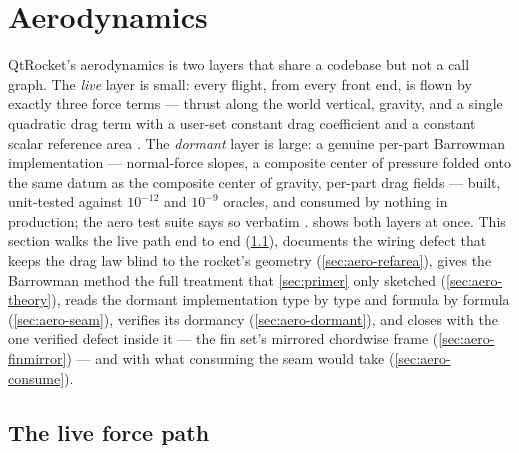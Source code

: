 \section{Aerodynamics}\label{sec:aero}

QtRocket's aerodynamics is two layers that share a codebase but not a call graph. The
\emph{live} layer is small: every flight, from every front end, is flown by exactly three
force terms --- thrust along the world vertical, gravity, and a single quadratic drag term
with a user-set constant drag coefficient and a constant scalar reference area
. The \emph{dormant} layer is large: a genuine per-part
Barrowman implementation --- normal-force slopes, a composite center of pressure folded onto
the same datum as the composite center of gravity, per-part drag fields --- built,
unit-tested against $10^{-12}$ and $10^{-9}$ oracles, and consumed by nothing in production;
the aero test suite says so verbatim .
 shows both layers at once. This section walks the live path end to
end (\cref{sec:aero-forcepath}), documents the wiring defect that keeps the drag law blind
to the rocket's geometry (\cref{sec:aero-refarea}), gives the Barrowman method the full
treatment that \cref{sec:primer} only sketched (\cref{sec:aero-theory}), reads the dormant
implementation type by type and formula by formula (\cref{sec:aero-seam}), verifies its
dormancy (\cref{sec:aero-dormant}), and closes with the one verified defect inside it --- the
fin set's mirrored chordwise frame (\cref{sec:aero-finmirror}) --- and with what consuming
the seam would take (\cref{sec:aero-consume}).


\subsection{The live force path}\label{sec:aero-forcepath}

